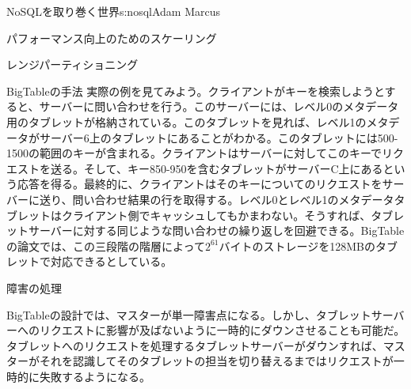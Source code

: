 \begin{aosachapter}{NoSQLを取り巻く世界}{s:nosql}{Adam Marcus}
\begin{aosasect1}{パフォーマンス向上のためのスケーリング}
\begin{aosasect2}{レンジパーティショニング}
\begin{aosasect3}{BigTableの手法}
実際の例を見てみよう。クライアントがキーを検索しようとすると、サーバーに問い合わせを行う。このサーバーには、レベル0のメタデータ用のタブレットが格納されている。このタブレットを見れば、レベル1のメタデータがサーバー6上のタブレットにあることがわかる。このタブレットには500-1500の範囲のキーが含まれる。クライアントはサーバーに対してこのキーでリクエストを送る。そして、キー850-950を含むタブレットがサーバーC上にあるという応答を得る。最終的に、クライアントはそのキーについてのリクエストをサーバーに送り、問い合わせ結果の行を取得する。レベル0とレベル1のメタデータタブレットはクライアント側でキャッシュしてもかまわない。そうすれば、タブレットサーバーに対する同じような問い合わせの繰り返しを回避できる。BigTableの論文では、この三段階の階層によって$2^{61}$バイトのストレージを128MBのタブレットで対応できるとしている。

\end{aosasect3}

\vspace{-0.1cm} %
\begin{aosasect3}{障害の処理}

BigTableの設計では、マスターが単一障害点になる。しかし、タブレットサーバーへのリクエストに影響が及ばないように一時的にダウンさせることも可能だ。タブレットへのリクエストを処理するタブレットサーバーがダウンすれば、マスターがそれを認識してそのタブレットの担当を切り替えるまではリクエストが一時的に失敗するようになる。


\end{aosasect3}
\end{aosasect2}
\end{aosasect1}
\end{aosachapter}

